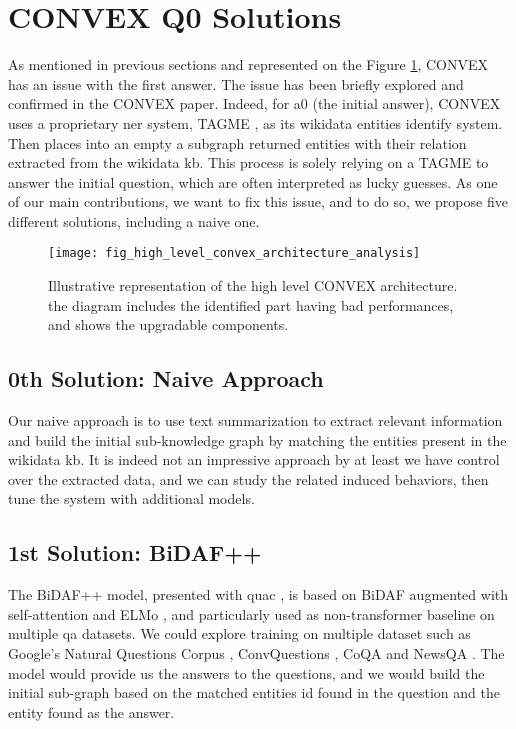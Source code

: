 \section{CONVEX Q0 Solutions}
As mentioned in previous sections and represented on the Figure \ref{fig:fig_high_level_convex_architecture_analysis}, CONVEX \autocite{paper:convex} has an issue with the first answer. The issue has been briefly explored and confirmed in the CONVEX paper. Indeed, for a0 (the initial answer), CONVEX uses a proprietary \gls{ner} system, TAGME \autocite{paper:CIKM-2010-FerraginaS}, as its \gls{wikidata} entities identify system. Then places into an empty a subgraph returned entities with their relation extracted from the \gls{wikidata} \gls{kb}. This process is solely relying on a TAGME to answer the initial question, which are often interpreted as lucky guesses. As one of our main contributions, we want to fix this issue, and to do so, we propose five different solutions, including a naive one. 

\begin{figure}[H]
    \centering
    \texttt{[image: fig\_high\_level\_convex\_architecture\_analysis]}
    \caption{Illustrative representation of the high level CONVEX architecture. the diagram includes the identified part having bad performances, and shows the upgradable components.}
    \label{fig:fig_high_level_convex_architecture_analysis}
\end{figure}

\subsection{0th Solution: Naive Approach}
Our naive approach is to use text summarization to extract relevant information and build the initial sub-knowledge graph by matching the entities present in the \gls{wikidata} \gls{kb}. It is indeed not an impressive approach by at least we have control over the extracted data, and we can study the related induced behaviors, then tune the system with additional models.

\subsection{1st Solution: BiDAF++}
\label{analysis:bidaf}
The BiDAF++ model, presented with \gls{quac} \autocite{paper:journals/corr/abs-1808-07036}, is based on BiDAF \autocite{paper:journals/corr/SeoKFH16} augmented with self-attention \autocite{paper:journals/corr/abs-1710-10723} and ELMo \autocite{paper:journals/corr/abs-1802-05365}, and particularly used as non-\gls{transformer} baseline on multiple \gls{qa} datasets. We could explore training on multiple dataset such as Google's Natural Questions Corpus \autocite{paper:google-natural-questions}, ConvQuestions \autocite{paper:convex}, CoQA \autocite{paper:journals/corr/abs-1808-07042} and NewsQA \autocite{paper:journals/corr/TrischlerWYHSBS16}. The model would provide us the answers to the questions, and we would build the initial sub-graph based on the matched entities id found in the question and the entity found as the answer.

